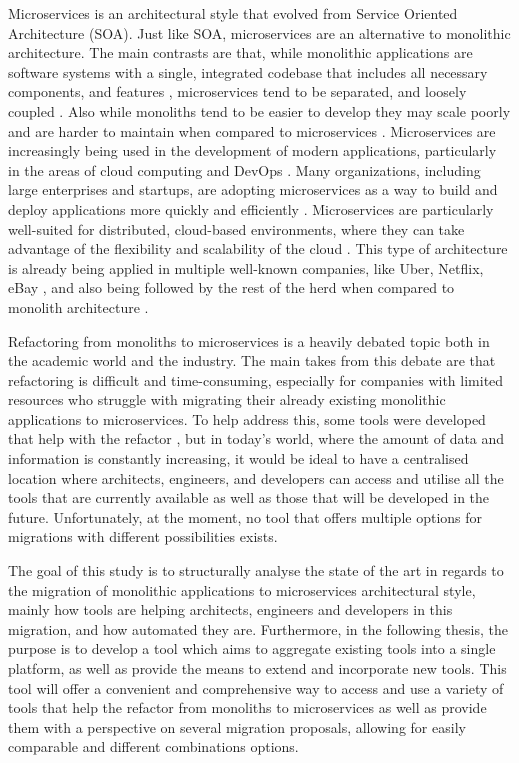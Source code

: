 Microservices is an architectural style that evolved from Service Oriented
Architecture (SOA). Just like SOA, microservices are an alternative to
monolithic architecture. The main contrasts are that, while monolithic
applications are software systems with a single, integrated codebase that
includes all necessary components, and features
\cite{kazanavivcius2019migrating}, microservices tend to be separated, and
loosely coupled \cite{newman2021building}. Also while monoliths tend to be
easier to develop they may scale poorly and are harder to maintain when
compared to microservices \cite{newman2019monolith}. Microservices are
increasingly being used in the development of modern applications, particularly
in the areas of cloud computing and DevOps \cite{ren2018migrating}. Many
organizations, including large enterprises and startups, are adopting
microservices as a way to build and deploy applications more quickly and
efficiently \cite{richardson-microservices}. Microservices are particularly
well-suited for distributed, cloud-based environments, where they can take
advantage of the flexibility and scalability of the cloud
\cite{fowler-microservices-prerequisites}. This type of architecture is already
being applied in multiple well-known companies, like Uber, Netflix, eBay
\cite{microservices-users}, and also being followed by the rest of the herd
when compared to monolith architecture \cite{taibi2017processes}.

Refactoring from monoliths to microservices is a heavily debated topic both in
the academic world and the industry. The main takes from this debate are that
refactoring is difficult and time-consuming, especially for companies with
limited resources who struggle with migrating their already existing monolithic
applications to microservices. To help address this, some tools were developed
that help with the refactor , but in today's world, where the
amount of data and information is constantly increasing, it would be ideal to
have a centralised location where architects, engineers, and developers can
access and utilise all the tools that are currently available as well as those
that will be developed in the future. Unfortunately, at the moment, no tool
that offers multiple options for migrations with different possibilities
exists.

The goal of this study is to structurally analyse the state of the art in
regards to the migration of monolithic applications to microservices
architectural style, mainly how tools are helping architects, engineers and
developers in this migration, and how automated they are. Furthermore, in the
following thesis, the purpose is to develop a tool which aims to aggregate
existing tools into a single platform, as well as provide the means to extend
and incorporate new tools. This tool will offer a convenient and comprehensive
way to access and use a variety of tools that help the refactor from monoliths
to microservices as well as provide them with a perspective on several
migration proposals, allowing for easily comparable and different combinations
options.

